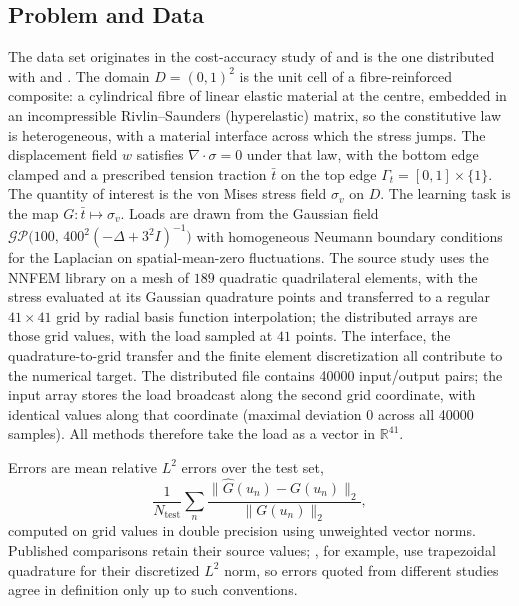 \documentclass[twoside,11pt]{article}
\begin{document}
\subsection{Problem and Data}
The data set originates in the cost-accuracy study of \citet{dehoop2022cost}
and is the one distributed with \citet{batlle2024kernel} and
\citet{mora2025operator}. The domain $D=(0,1)^2$ is the unit cell of a
fibre-reinforced composite: a cylindrical fibre of linear elastic material at
the centre, embedded in an incompressible Rivlin--Saunders (hyperelastic)
matrix, so the constitutive law is heterogeneous, with a material interface
across which the stress jumps. The displacement field $w$ satisfies
$\nabla\cdot\sigma=0$ under that law, with the bottom edge clamped and a
prescribed tension traction $\bar t$ on the top edge
$\Gamma_t=[0,1]\times\{1\}$. The quantity of interest is the von Mises
stress field $\sigma_v$ on $D$. The learning task is
the map $G:\bar t\mapsto\sigma_v$. Loads are drawn from the Gaussian field
$\mathcal{GP}\big(100,\,400^2(-\Delta+3^2 I)^{-1}\big)$ with homogeneous
Neumann boundary conditions for the Laplacian on spatial-mean-zero
fluctuations. The source study uses the NNFEM library on a
mesh of $189$ quadratic quadrilateral elements, with the stress evaluated
at its Gaussian quadrature points and
transferred to a regular $41\times41$ grid by radial basis function
interpolation; the distributed arrays are those grid values, with the load
sampled at $41$ points. The interface, the quadrature-to-grid transfer and the
finite element discretization all contribute to the numerical target.
The distributed file contains 40000 input/output pairs; the
input array stores the load broadcast along the second grid coordinate, with identical values along that coordinate (maximal deviation $0$ across all 40000
samples). All methods therefore take the load as a vector in $\mathbb R^{41}$.

Errors are mean relative $L^2$ errors over the test set,
\[
\frac1{N_{\mathrm{test}}}\sum_{n}\frac{\|\widehat
G(u_n)-G(u_n)\|_2}{\|G(u_n)\|_2},
\]
computed on grid values in double precision using unweighted vector norms.
Published comparisons retain their source values; \citet{batlle2024kernel},
for example, use trapezoidal quadrature for their discretized $L^2$ norm, so
errors quoted from different studies agree in definition only up to such
conventions.
\end{document}
